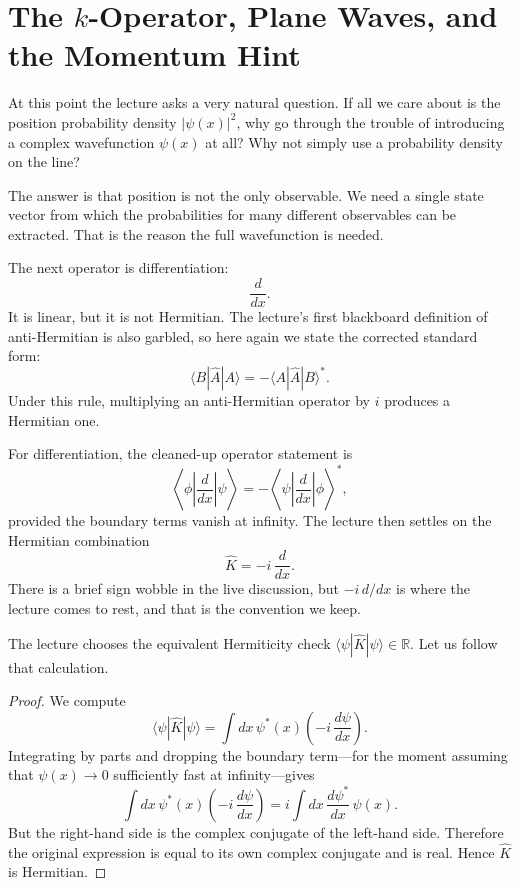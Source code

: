 \section{The \(k\)-Operator, Plane Waves, and the Momentum Hint}

At this point the lecture asks a very natural question. If all we care about is the position probability density \(|\psi(x)|^2\), why go through the trouble of introducing a complex wavefunction \(\psi(x)\) at all? Why not simply use a probability density on the line?

The answer is that position is not the only observable. We need a single state vector from which the probabilities for many different observables can be extracted. That is the reason the full wavefunction is needed.

The next operator is differentiation:
\begin{equation}
\frac{d}{dx}.
\end{equation}
It is linear, but it is not Hermitian. The lecture's first blackboard definition of anti-Hermitian is also garbled, so here again we state the corrected standard form:
\begin{equation}
\langle B|\hat A|A\rangle=-\langle A|\hat A|B\rangle^*.
\end{equation}
Under this rule, multiplying an anti-Hermitian operator by \(i\) produces a Hermitian one.

For differentiation, the cleaned-up operator statement is
\begin{equation}
\left\langle \phi \left| \frac{d}{dx} \right| \psi \right\rangle
=
-\left\langle \psi \left| \frac{d}{dx} \right| \phi \right\rangle^*,
\end{equation}
provided the boundary terms vanish at infinity. The lecture then settles on the Hermitian combination
\begin{equation}
\hat K=-i\,\frac{d}{dx}.
\end{equation}
There is a brief sign wobble in the live discussion, but \(-i\,d/dx\) is where the lecture comes to rest, and that is the convention we keep.

The lecture chooses the equivalent Hermiticity check \(\langle \psi|\hat K|\psi\rangle\in\mathbb R\). Let us follow that calculation.

\begin{proof}
We compute
\begin{equation}
\langle \psi|\hat K|\psi\rangle
=
\int dx\, \psi^*(x)\left(-i\,\frac{d\psi}{dx}\right).
\end{equation}
Integrating by parts and dropping the boundary term---for the moment assuming that \(\psi(x)\to 0\) sufficiently fast at infinity---gives
\begin{equation}
\int dx\, \psi^*(x)\left(-i\,\frac{d\psi}{dx}\right)
=
i\int dx\, \frac{d\psi^*}{dx}\,\psi(x).
\end{equation}
But the right-hand side is the complex conjugate of the left-hand side. Therefore the original expression is equal to its own complex conjugate and is real. Hence \(\hat K\) is Hermitian.
\end{proof}

